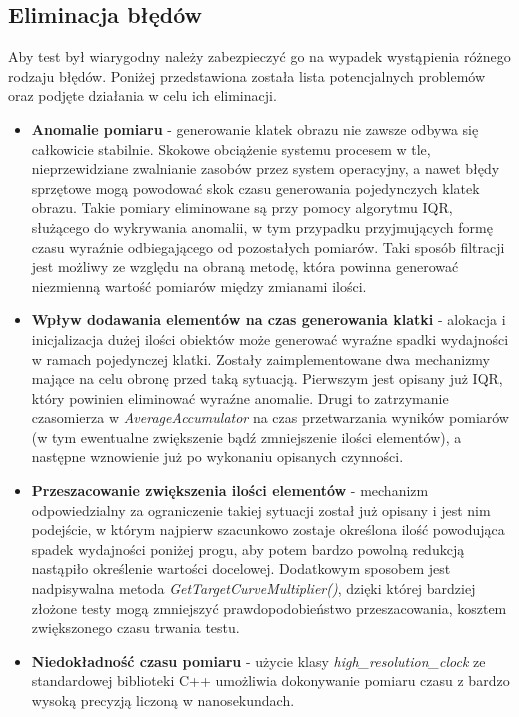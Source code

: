 	\subsection{Eliminacja błędów}
	Aby test był wiarygodny należy zabezpieczyć go na wypadek wystąpienia różnego rodzaju błędów. Poniżej przedstawiona została lista potencjalnych problemów oraz podjęte działania w celu ich eliminacji.
	\begin{itemize}
		\item \textbf{Anomalie pomiaru} - generowanie klatek obrazu nie zawsze odbywa się całkowicie stabilnie. Skokowe obciążenie systemu procesem w tle, nieprzewidziane zwalnianie zasobów przez system operacyjny, a nawet błędy sprzętowe mogą powodować skok czasu generowania pojedynczych klatek obrazu. Takie pomiary eliminowane są przy pomocy algorytmu IQR, służącego do wykrywania anomalii, w tym przypadku przyjmujących formę czasu wyraźnie odbiegającego od pozostałych pomiarów. Taki sposób filtracji jest możliwy ze względu na obraną metodę, która powinna generować niezmienną wartość pomiarów między zmianami ilości.
		\item \textbf{Wpływ dodawania elementów na czas generowania klatki} - alokacja i inicjalizacja dużej ilości obiektów może generować wyraźne spadki wydajności w ramach pojedynczej klatki. Zostały zaimplementowane dwa mechanizmy mające na celu obronę przed taką sytuacją. Pierwszym jest opisany już IQR, który powinien eliminować wyraźne anomalie. Drugi to zatrzymanie czasomierza w \textit{AverageAccumulator} na czas przetwarzania wyników pomiarów (w tym ewentualne zwiększenie bądź zmniejszenie ilości elementów), a następne wznowienie już po wykonaniu opisanych czynności. 
		\item \textbf{Przeszacowanie zwiększenia ilości elementów} - mechanizm odpowiedzialny za ograniczenie takiej sytuacji został już opisany i jest nim podejście, w którym najpierw szacunkowo zostaje określona ilość powodująca spadek wydajności poniżej progu, aby potem bardzo powolną redukcją nastąpiło określenie wartości docelowej. Dodatkowym sposobem jest nadpisywalna metoda \textit{GetTargetCurveMultiplier()}, dzięki której bardziej złożone testy mogą zmniejszyć prawdopodobieństwo przeszacowania, kosztem zwiększonego czasu trwania testu.
		\item \textbf{Niedokładność czasu pomiaru} - użycie klasy \textit{high\_resolution\_clock} ze standardowej biblioteki C++ umożliwia dokonywanie pomiaru czasu z bardzo wysoką precyzją liczoną w nanosekundach.
	\end{itemize}